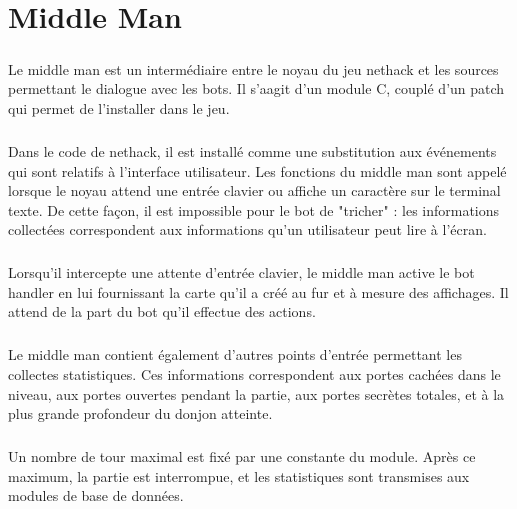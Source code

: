 \chapter{Middle Man}
\paragraph{}
Le middle man est un intermédiaire entre le noyau du jeu nethack
et les sources permettant le dialogue avec les bots. Il s'aagit d'un module C,
couplé d'un patch qui permet de l'installer dans le jeu.

\paragraph{}
Dans le code de nethack,
il est installé comme une substitution aux événements qui sont relatifs
à l'interface utilisateur. Les fonctions du middle man sont appelé lorsque le
noyau attend une entrée clavier ou affiche un caractère sur le terminal texte.
De cette façon, il est impossible pour le bot de "tricher" : les informations 
collectées correspondent aux informations qu'un utilisateur peut lire à l'écran.

\paragraph{}
Lorsqu'il intercepte une attente d'entrée clavier, le middle man active le
bot handler en lui fournissant la carte qu'il a créé au fur et à mesure des affichages.
Il attend de la part du bot qu'il effectue des actions. 

\paragraph{}
Le middle man contient également d'autres points d'entrée permettant les collectes 
statistiques. Ces informations correspondent aux portes cachées dans le niveau, aux portes
ouvertes pendant la partie, aux portes secrètes totales, et à la plus grande
profondeur du donjon atteinte.

\paragraph{}
Un nombre de tour maximal est fixé par une constante du module.
Après ce maximum, la partie est interrompue, et les statistiques sont transmises aux modules de
base de données.

